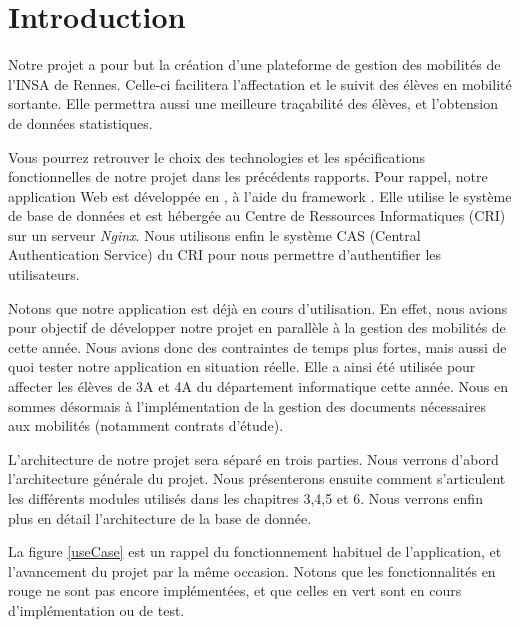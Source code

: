 \chapter{Introduction}

Notre projet a pour but la création d'une plateforme de gestion des mobilités de l'INSA de Rennes. Celle-ci facilitera l'affectation et le suivit des élèves en mobilité sortante. Elle permettra aussi une meilleure traçabilité des élèves, et l'obtension de données statistiques.

Vous pourrez retrouver le choix des technologies et les spécifications fonctionnelles de notre projet dans les précédents rapports. Pour rappel, notre application Web est développée en \php, à l'aide du framework \symfony. Elle utilise le système de base de données \mdb et est hébergée au Centre de Ressources Informatiques (CRI) sur un serveur \textit{Nginx}. Nous utilisons enfin le système CAS (Central Authentication Service) du CRI pour nous permettre d'authentifier les utilisateurs.

\bigbreak

Notons que notre application est déjà en cours d'utilisation. En effet, nous avions pour objectif de développer notre projet en parallèle à la gestion des mobilités de cette année. Nous avions donc des contraintes de temps plus fortes, mais aussi de quoi tester notre application en situation réelle. Elle a ainsi été utilisée pour affecter les élèves de 3A et 4A du département informatique cette année. Nous en sommes désormais à l'implémentation de la gestion des documents nécessaires aux mobilités (notamment contrats d'étude).

\bigbreak

L'architecture de notre projet sera séparé en trois parties. Nous verrons d'abord l'architecture générale du projet. Nous présenterons ensuite comment s'articulent les différents modules utilisés dans les chapitres 3,4,5 et 6. Nous verrons enfin plus en détail l'architecture de la base de donnée.

\bigbreak
La figure \ref{useCase} est un rappel du fonctionnement habituel de l'application, et l'avancement du projet par la même occasion. Notons que les fonctionnalités en rouge ne sont pas encore implémentées, et que celles en vert sont en cours d'implémentation ou de test. 


